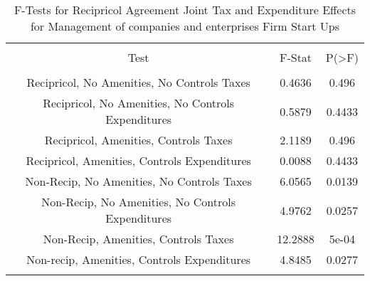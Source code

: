 
\begin{table}[!htbp] \centering 
  \caption{F-Tests for Recipricol Agreement Joint Tax and Expenditure Effects for Management of companies and enterprises Firm Start Ups} 
  \label{55Ftests} 
\begin{tabular}{@{\extracolsep{5pt}} ccc} 
\\[-1.8ex]\hline 
\hline \\[-1.8ex] 
Test & F-Stat & P(\textgreater F) \\ 
\hline \\[-1.8ex] 
Recipricol, No Amenities, No Controls Taxes & 0.4636 & 0.496 \\ 
Recipricol, No Amenities, No Controls Expenditures & 0.5879 & 0.4433 \\ 
Recipricol, Amenities, Controls Taxes & 2.1189 & 0.496 \\ 
Recipricol, Amenities, Controls Expenditures & 0.0088 & 0.4433 \\ 
Non-Recip, No Amenities, No Controls Taxes & 6.0565 & 0.0139 \\ 
Non-Recip, No Amenities, No Controls Expenditures & 4.9762 & 0.0257 \\ 
Non-Recip, Amenities, Controls Taxes & 12.2888 & 5e-04 \\ 
Non-recip, Amenities, Controls Expenditures & 4.8485 & 0.0277 \\ 
\hline \\[-1.8ex] 
\end{tabular} 
\end{table} 

